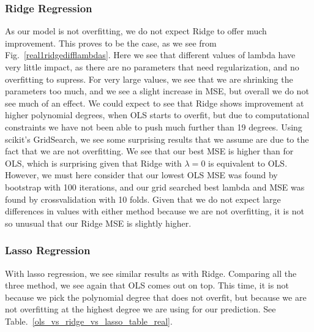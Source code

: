 \documentclass[twocolumn,10pt,cleanfoot]{asme2ej}
\begin{document}
\subsubsection{Ridge Regression}

As our model is not overfitting, we do not expect Ridge to offer much improvement. This proves to be the case, as we see from Fig.~\ref{real1ridgedifflambdas}. Here we see that different values of lambda have very little impact, as there are no parameters that need regularization, and no overfitting to supress. For very large values, we see that we are shrinking the parameters too much, and we see a slight increase in MSE, but overall we do not see much of an effect. We could expect to see that Ridge shows improvement at higher polynomial degrees, when OLS starts to overfit, but due to computational constraints we have not been able to push much further than 19 degrees. Using scikit's GridSearch, we see some surprising results that we assume are due to the fact that we are not overfitting. We see that our best MSE is higher than for OLS, which is surprising given that Ridge with $\lambda = 0$ is equivalent to OLS. However, we must here consider that our lowest OLS MSE was found by bootstrap with 100 iterations, and our grid searched best lambda and MSE was found by crossvalidation with 10 folds. Given that we do not expect large differences in values with either method because we are not overfitting, it is not so unusual that our Ridge MSE is slightly higher.

\subsubsection{Lasso Regression}

With lasso regression, we see similar results as with Ridge. Comparing all the three method, we see again that OLS comes out on top. This time, it is not because we pick the polynomial degree that does not overfit, but because we are not overfitting at the highest degree we are using for our prediction. See Table.~\ref{ols_vs_ridge_vs_lasso_table_real}.
\end{document}
